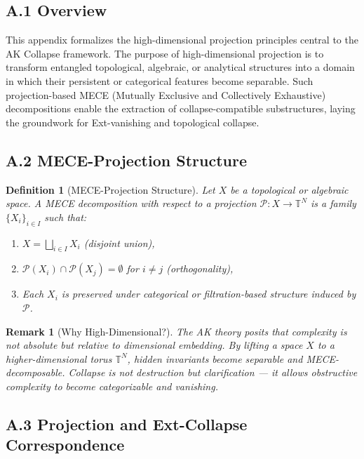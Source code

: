 \documentclass[11pt]{article}
\newtheorem{definition}[theorem]{Definition}
\newtheorem{remark}[theorem]{Remark}
\begin{document}
\subsection*{A.1 Overview}

This appendix formalizes the high-dimensional projection principles central to the AK Collapse framework. The purpose of high-dimensional projection is to transform entangled topological, algebraic, or analytical structures into a domain in which their persistent or categorical features become separable.  
Such projection-based MECE (Mutually Exclusive and Collectively Exhaustive) decompositions enable the extraction of collapse-compatible substructures, laying the groundwork for Ext-vanishing and topological collapse.

\subsection*{A.2 MECE-Projection Structure}

\begin{definition}[MECE-Projection Structure]
Let $X$ be a topological or algebraic space. A MECE decomposition with respect to a projection $\mathcal{P}: X \to \mathbb{T}^N$ is a family $\{X_i\}_{i \in I}$ such that:
\begin{enumerate}
  \item $X = \bigsqcup_{i \in I} X_i$ (disjoint union),
  \item $\mathcal{P}(X_i) \cap \mathcal{P}(X_j) = \emptyset$ for $i \ne j$ (orthogonality),
  \item Each $X_i$ is preserved under categorical or filtration-based structure induced by $\mathcal{P}$.
\end{enumerate}
\end{definition}

\begin{remark}[Why High-Dimensional?]
The AK theory posits that complexity is not absolute but relative to dimensional embedding.  
By lifting a space $X$ to a higher-dimensional torus $\mathbb{T}^N$, hidden invariants become separable and MECE-decomposable.  
Collapse is not destruction but clarification — it allows obstructive complexity to become categorizable and vanishing.
\end{remark}

\subsection*{A.3 Projection and Ext-Collapse Correspondence}
\end{document}
